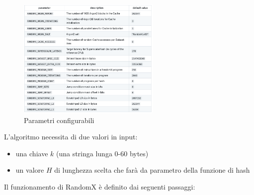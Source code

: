 \documentclass[12pt,a4paper]{article}
\begin{document}
\begin{figure}[h]
    \centering
    \includegraphics[width=0.61\textwidth]{./images/randomx_parameters.png}
    \caption{Parametri configurabili}
    \label{fig:parameters}
\end{figure}

L'algoritmo necessita di due valori in input:

\begin{itemize}
    \item una chiave $k$ (una stringa lunga 0-60 bytes)
    \item un valore $H$ di lunghezza scelta che farà da parametro della funzione
    di hash
\end{itemize}

Il funzionamento di RandomX è definito dai seguenti passaggi:
\end{document}
